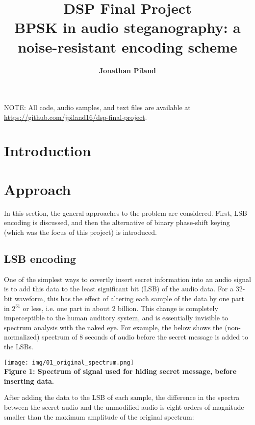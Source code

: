 \documentclass{article}
\title{\vspace{64pt} \bf{DSP Final Project} \\ \textnormal{BPSK in audio steganography: a noise-resistant encoding scheme}}
\author{\bf{Jonathan Piland}}
\date{\parbox{\linewidth}{\centering
  \endgraf\bigskip
  \classname\endgraf
  \classprof\endgraf\medskip
  Whiting School of Engineering \endgraf
Johns Hopkins University\endgraf\bigskip\displaydate{date}}}
\begin{document}
\maketitle

NOTE: All code, audio samples, and text files are available at 
\url{https://github.com/jpiland16/dsp-final-project}.

\newpage
\section{Introduction}

\section{Approach}

In this section, the general approaches to the problem are considered. First,
LSB encoding is discussed, and then the alternative of binary phase-shift keying
(which was the focus of this project) is introduced.

\subsection{LSB encoding}

One of the simplest ways to covertly insert secret information into an audio
signal is to add this data to the least significant bit (LSB) of the audio data.
For a 32-bit waveform, this has the effect of altering each sample of the data
by one part in $2^31$ or less, i.e. one part in about 2 billion. This change is
completely imperceptible to the human auditory system, and is essentially
invisible to spectrum analysis with the naked eye. For example, the below shows
the (non-normalized) spectrum of 8 seconds of audio before the secret message is
added to the LSBs. 

\begin{center}
  \texttt{[image: img/01\_original\_spectrum.png]} \\
  \textbf{Figure 1: Spectrum of signal used for hiding secret message, before inserting data.}
\end{center}

After adding the data to the LSB of each sample, the difference in the spectra
between the secret audio and the unmodified audio is eight orders of magnitude
smaller than the maximum amplitude of the original spectrum:
\end{document}

